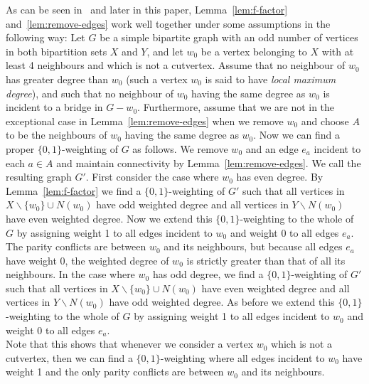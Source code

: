 \documentclass[
final,
 nomarks,
]{dmtcs-episciences}
\theoremstyle{definition}
\begin{document}
\noindent As can be seen in~\cite{TWZ} and later in this paper, Lemma~\ref{lem:f-factor} and~\ref{lem:remove-edges} work well together under some assumptions in the following way: Let $G$ be a simple bipartite graph with an odd number of vertices in both bipartition sets $X$ and $Y$, and let $w_0$ be a vertex belonging to $X$ with at least 4 neighbours and which is not a cutvertex. Assume that no neighbour of $w_0$ has greater degree than $w_0$ (such a vertex $w_0$ is said to have \emph{local maximum degree}), and such that no neighbour of $w_0$ having the same degree as $w_0$ is incident to a bridge in $G-w_0$. Furthermore, assume that we are not in the exceptional case in Lemma~\ref{lem:remove-edges} when we remove $w_0$ and choose $A$ to be the neighbours of $w_0$ having the same degree as $w_0$. Now we can find a proper $\{0,1\}$-weighting of $G$ as follows. We remove $w_0$ and an edge $e_a$ incident to each $a \in A$ and maintain connectivity by Lemma~\ref{lem:remove-edges}. We call the resulting graph $G'$. First consider the case where $w_0$ has even degree. By Lemma~\ref{lem:f-factor} we find a $\{0,1\}$-weighting of $G'$ such that all vertices in $X\backslash \{w_0\}\cup N(w_0)$ have odd weighted degree and all vertices in $Y\backslash N(w_0)$ have even weighted degree. Now we extend this $\{0,1\}$-weighting to the whole of $G$ by assigning weight 1 to all edges incident to $w_0$ and weight 0 to all edges $e_a$. The parity conflicts are between $w_0$ and its neighbours, but because all edges $e_a$ have weight 0, the weighted degree of $w_0$ is strictly greater than that of all its neighbours.
In the case where $w_0$ has odd degree, we find a $\{0,1\}$-weighting of $G'$ such that all vertices in $X\backslash \{w_0\} \cup N(w_0)$ have even weighted degree and all vertices in $Y\backslash N(w_0)$ have odd weighted degree. As before we extend this $\{0,1\}$-weighting to the whole of $G$ by assigning weight 1 to all edges incident to $w_0$ and weight 0 to all edges $e_a$. \\
Note that this shows that whenever we consider a vertex $w_0$ which is not a cutvertex, then we can find a $\{0,1\}$-weighting where all edges incident to $w_0$ have weight 1 and the only parity conflicts are between $w_0$ and its neighbours. \\ \\
\end{document}
